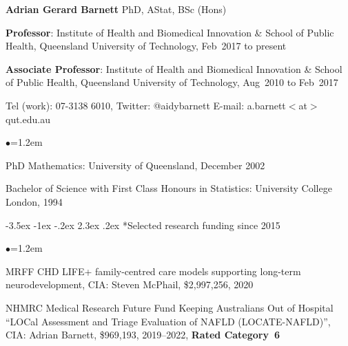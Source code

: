 \documentclass[a4paper,11pt]{article}
\makeatletter
\renewcommand\section{\@startsection {section}{1}{\z@}%
                                   {-3.5ex \@plus -1ex \@minus -.2ex}%
                                   {2.3ex \@plus.2ex}%
                                   {\normalfont\large\bfseries\color{blue}}}
\renewcommand{\labelitemi}{$\bullet$}
\makeatother
\begin{document}
\begin{raggedright}


\begin{center}
\textbf{Adrian Gerard Barnett} PhD, AStat, BSc (Hons)
\end{center}

\textbf{Professor}: Institute of Health and Biomedical Innovation \& School of Public Health, Queensland University of Technology, Feb~2017 to present

\textbf{Associate Professor}: Institute of Health and Biomedical Innovation \& School of Public Health, Queensland University of Technology, Aug~2010 to Feb~2017

Tel (work): 07-3138 6010, Twitter: @aidybarnett
E-mail: a.barnett$<$at$>$qut.edu.au

\begin{list}{\labelitemi}{\leftmargin=1.2em}\addtolength{\itemsep}{-0.5\baselineskip}
\item PhD Mathematics: University of Queensland, December 2002
\item Bachelor of Science with First Class Honours in Statistics: University College London, 1994
\end{list}

\label{papersstart}
\label{papersstop}

\section*{Selected research funding since 2015}

\begin{list}{\labelitemi}{\leftmargin=1.2em}\addtolength{\itemsep}{-0.5\baselineskip}

\item MRFF CHD LIFE+ family-centred care models supporting long-term neurodevelopment, CIA: Steven McPhail, \$2,997,256, 2020

\item NHMRC Medical Research Future Fund Keeping Australians Out of Hospital ``LOCal Assessment and Triage Evaluation of NAFLD (LOCATE-NAFLD)'', CIA: Adrian Barnett, \$969,193, 2019--2022, \textbf{Rated Category~6}


\end{list}
\end{raggedright}
\end{document}

